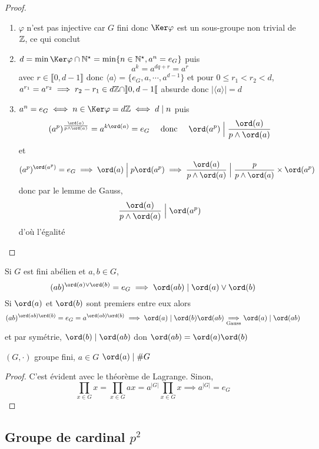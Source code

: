 \begin{proof}~
    \begin{enumerate}
        \item $\varphi$ n'est pas injective car $G$ fini donc $\Ker \varphi$ est un sous-groupe non trivial de $\mathbb Z$, ce qui conclut
        \item $d=\min \Ker\varphi\cap \N^\star=\min\{n\in\N^\star, a^n=e_G\}$ puis \[
                a^k=a^{dq+r}=a^r
            \] avec $r\in\llbracket 0, d-1\rrbracket$ donc $\langle a\rangle = \{e_G, a, \cdots, a^{d-1}\}$ et pour $0\leq r_1<r_2<d$, $a^{r_1}=a^{r_2} \implies r_2-r_1\in d\mathbb Z\cap \rrbracket 0, d-1 \llbracket $ absurde donc $|\langle a \rangle |=d$
        \item $a^n=e_G\iff n\in\Ker \varphi=d\Z\iff d\;|\;n$ puis \[
                \left( a^p \right)^{\frac{\ord (a)}{p\land \ord(a)}}=a^{k\ord(a)}=e_G\quad \text{ donc }\quad \ord(a^p)\;\Big|\;\frac{\ord(a)}{p\land\ord(a)}
            \]
            et \[
                (a^p)^{\ord (a^p)}=e_G \implies \ord(a)\;\Big|\;p\ord (a^p) \implies \frac{\ord(a)}{p\land \ord(a)}\;\Big|\; \frac{p}{p\land \ord(a)}\times \ord(a^p)
            \]
            donc par le lemme de Gauss, \[
                \frac{\ord(a)}{p\land \ord(a)}\;\Big|\; \ord(a^p)
            \]
            d'où l'égalité
    \end{enumerate}
\end{proof}

\begin{rem}
    Si $G$ est fini abélien et $a, b\in G$, \[
        (ab)^{\ord(a)\lor \ord(b)}=e_G\implies \ord (ab)\;|\; \ord(a)\lor \ord(b)
    \]
    Si $\ord (a)$ et $\ord (b)$ sont premiers entre eux alors \[
        (ab)^{\ord(ab)\ord (b)}=e_G=a^{\ord(ab)\ord(b)}\implies \ord (a)\;|\;\ord (b)\ord(ab)\underset{\text{Gauss}}\implies \ord(a)\;|\;\ord(ab)
    \]
    et par symétrie, $\ord(b)\;|\;\ord (ab)$ don $\ord(ab)=\ord(a)\ord(b)$
\end{rem}

\begin{prop}
    \Hyp $(G, \cdot)$ groupe fini, $a\in G$
    \Conc $\ord(a)\;|\;\# G$
\end{prop}

\begin{proof}
    C'est évident avec le théorème de Lagrange. Sinon, \[
        \prod_{x\in G}x=\prod_{x\in G}ax=a^{|G|}\prod_{x\in G}x \implies a^{|G|}=e_G
    \]
\end{proof}

\subsection{Groupe de cardinal $p^2$}

